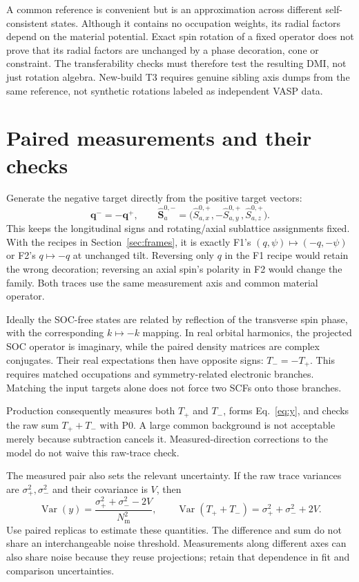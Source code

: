 \documentclass[11pt,a4paper]{article}
\numberwithin{equation}{section}
\newcommand{\vct}[1]{\bm{#1}}
\newcommand{\qh}{\vct q}
\newcommand{\Nm}{N_{\mathrm m}}
\newcommand{\Var}{\operatorname{Var}}
\newcommand{\code}[1]{\texttt{\detokenize{#1}}}
\begin{document}
A common reference \code{CSO} is convenient but is an approximation across
different self-consistent states. Although it contains no occupation
weights, its radial factors depend on the material potential. Exact spin
rotation of a fixed operator does not prove that its radial factors are
unchanged by a phase decoration, cone or constraint. The transferability
checks must therefore test the resulting DMI, not just rotation algebra.
New-build T3 requires genuine sibling axis dumps from the same reference,
not synthetic rotations labeled as independent VASP data.

\section{Paired measurements and their checks}\label{sec:pairs}

Generate the negative target directly from the positive target vectors:
\begin{equation}\label{eq:partners}
 \qh^-=-\qh^+,\qquad
 \hat{\vct S}_a^{0,-}
 =\bigl(\hat S_{a,x}^{0,+},-\hat S_{a,y}^{0,+},\hat S_{a,z}^{0,+}\bigr).
\end{equation}
This keeps the longitudinal signs and rotating/axial sublattice assignments
fixed. With the recipes in Section~\ref{sec:frames}, it is exactly F1's
$(q,\psi)\mapsto(-q,-\psi)$ or F2's $q\mapsto-q$ at unchanged tilt.
Reversing only $q$ in the F1 recipe would retain the wrong decoration;
reversing an axial spin's polarity in F2 would change the family.
Both traces use the same measurement axis and common material operator.


Ideally the SOC-free states are related by reflection of the transverse
spin phase, with the corresponding $k\mapsto-k$ mapping. In real orbital
harmonics, the projected SOC operator is imaginary, while the paired
density matrices are complex conjugates. Their real expectations then have
opposite signs: $T_-=-T_+$. This requires matched occupations and
symmetry-related electronic branches. Matching the input targets alone
does not force two SCFs onto those branches.

Production consequently measures both $T_+$ and $T_-$, forms
Eq.~\eqref{eq:y}, and checks the raw sum $T_++T_-$ with P0. A large common
background is not acceptable merely because subtraction cancels it.
Measured-direction corrections to the model do not waive this raw-trace check.

The measured pair also sets the relevant uncertainty. If the raw trace
variances are $\sigma_+^2,\sigma_-^2$ and their covariance is $V$, then
\begin{equation}\label{eq:noise}
 \Var(y)=\frac{\sigma_+^2+\sigma_-^2-2V}{\Nm^2},\qquad
 \Var(T_++T_-)=\sigma_+^2+\sigma_-^2+2V.
\end{equation}
Use paired replicas to estimate these quantities. The difference and sum
do not share an interchangeable noise threshold. Measurements along
different axes can also share noise because they reuse projections; retain
that dependence in fit and comparison uncertainties.
\end{document}
